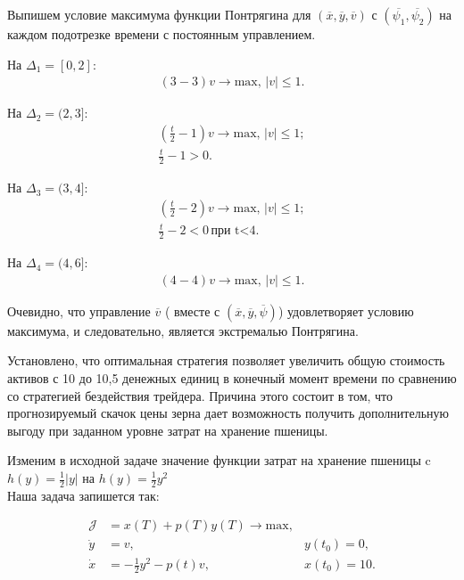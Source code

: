 Выпишем условие максимума функции Понтрягина для $(\overline{x}, \overline{y}, \overline{v})$ с $(\overline{\psi_1}, \overline{\psi_2})$ на каждом подотрезке времени с постоянным управлением.

На $\Delta_1 = [0, 2]$: 
\begin{gather*}
    (3 - 3) v \to \mathrm{max}, \,
    |v| \le 1.
\end{gather*}

На $\Delta_2 = (2, 3]$: 
\begin{gather*}
    (\frac{t}{2} - 1) v \to \mathrm{max}, \,  |v| \le 1;\\
\frac{t}{2} - 1 > 0.
\end{gather*}

На $\Delta_3 = (3, 4]$: 
\begin{gather*}
    (\frac{t}{2} - 2) v \to \mathrm{max}, \, |v| \le 1;\\
    \frac{t}{2} - 2 < 0 \, \textrm{при t<4.}
\end{gather*}

На $\Delta_4 = (4, 6]$: 
\begin{gather*}
    (4- 4) v \to \mathrm{max}, \,
    |v| \le 1.
\end{gather*}

Очевидно, что управление $\overline{v}$  ( вместе с $(\overline{x}, \overline{y}, \overline{\psi})$) удовлетворяет условию максимума, и следовательно, является экстремалью Понтрягина.

Установлено, что оптимальная стратегия позволяет увеличить общую стоимость активов с 10 до 10,5 денежных единиц в конечный момент времени по сравнению со стратегией бездействия трейдера. Причина этого состоит в том, что прогнозируемый скачок цены зерна дает возможность получить дополнительную выгоду при заданном уровне затрат на хранение пшеницы.



Изменим в исходной задаче значение функции затрат на хранение пшеницы  c ${h(y)} = \frac{1}{2}|y|$ на $ {h(y)} = \frac{1}{2} y^2 $\\

Наша задача запишется так:

\begin{align}
\mathcal{J} & = x(T) + p(T) y(T) \to \mathrm{max},\\
    \Dot{y} & = v, & y(t_{0}) = 0, \\
    \Dot{x} & = - \frac{1}{2} y^2 - p(t) v, & x(t_{0}) = 10.
\end{align}

